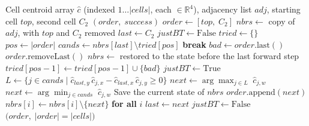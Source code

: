 \documentclass[12pt,a4paper]{article}
\theoremstyle{definition}
\newcommand{\algorithmicbreak}{\textbf{break}}
\newcommand{\Break}{\State\algorithmicbreak}
\begin{document}
\begin{algorithm}[h]
\caption{peeling1back (one-step backtrack, selection loop)}
\label{alg:1back}
\begin{algorithmic}[1]
\Require Cell centroid array $\hat{c}$ (indexed $1\ldots|\mathit{cells}|$, each $\in\mathbb{R}^4$),
         adjacency list $\mathit{adj}$,
         starting cell $\mathit{top}$, second cell $C_2$
\Ensure  $(\mathit{order},\; \mathit{success})$
\State $\mathit{order} \gets [\mathit{top},\; C_2]$
\State $\mathit{nbrs} \gets$ copy of $\mathit{adj}$, with $\mathit{top}$ and $C_2$ removed
\State $\mathit{last} \gets C_2$
\State $\mathit{justBT} \gets \mathrm{False}$
\State $\mathit{tried} \gets \{\}$
  \State $\mathit{pos} \gets |\mathit{order}|$
  \State $\mathit{cands} \gets \mathit{nbrs}[\mathit{last}]
           \setminus \mathit{tried}[\mathit{pos}]$
      \Break
    \EndIf
    \State $\mathit{bad} \gets \mathit{order}.\mathrm{last}()$
    \State $\mathit{order}.\mathrm{removeLast}()$
    \State $\mathit{nbrs} \gets$ restored to the state before the last forward step
    \State $\mathit{tried}[\mathit{pos}-1] \gets
             \mathit{tried}[\mathit{pos}-1] \cup \{\mathit{bad}\}$
    \State $\mathit{justBT} \gets \mathrm{True}$
  \Else
    \State $L \gets \bigl\{j \in \mathit{cands} \mid
               \hat{c}_{\mathit{last},y}\,\hat{c}_{j,x}
               - \hat{c}_{\mathit{last},x}\,\hat{c}_{j,y} \geq 0\bigr\}$
      \State $\mathit{next} \gets \arg\max_{j \in L}\; \hat{c}_{j,w}$
    \Else
      \State $\mathit{next} \gets \arg\min_{j \in \mathit{cands}}\; \hat{c}_{j,w}$
    \EndIf
    \State Save the current state of $\mathit{nbrs}$
    \State $\mathit{order}.\mathrm{append}(\mathit{next})$
    \State $\mathit{nbrs}[i] \gets \mathit{nbrs}[i] \setminus \{\mathit{next}\}$
      \hspace{1em}\textbf{for all} $i$
    \State $\mathit{last} \gets \mathit{next}$
    \State $\mathit{justBT} \gets \mathrm{False}$
  \EndIf
\EndWhile
\State \Return $\bigl(\mathit{order},\; |\mathit{order}| = |\mathit{cells}|\bigr)$
\end{algorithmic}
\end{algorithm}
\end{document}
